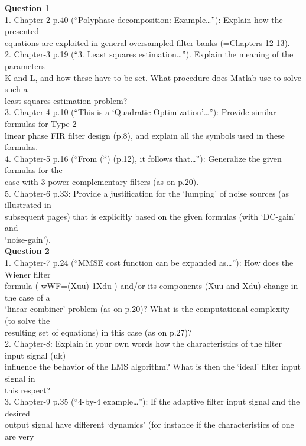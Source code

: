 \documentclass[
  a4paper,
  ,captions=tableheading
]{scrartcl}
\begin{document}
\textbf{Question 1}\\
1. Chapter-2 p.40 (``Polyphase decomposition: Example\ldots''): Explain
how the presented\\
equations are exploited in general oversampled filter banks (=Chapters
12-13).\\
2. Chapter-3 p.19 (``3. Least squares estimation\ldots''). Explain the
meaning of the parameters\\
K and L, and how these have to be set. What procedure does Matlab use to
solve such a\\
least squares estimation problem?\\
3. Chapter-4 p.10 (``This is a `Quadratic Optimization'\ldots{}''):
Provide similar formulas for Type-2\\
linear phase FIR filter design (p.8), and explain all the symbols used
in these formulas.\\
4. Chapter-5 p.16 (``From (*) (p.12), it follows that\ldots''):
Generalize the given formulas for the\\
case with 3 power complementary filters (as on p.20).\\
5. Chapter-6 p.33: Provide a justification for the `lumping' of noise
sources (as illustrated in\\
subsequent pages) that is explicitly based on the given formulas (with
`DC-gain' and\\
`noise-gain').\\
\textbf{Question 2}\\
1. Chapter-7 p.24 (``MMSE cost function can be expanded as\ldots{}''):
How does the Wiener filter\\
formula ( wWF=(Xuu)-1Xdu ) and/or its components (Xuu and Xdu) change in
the case of a\\
`linear combiner' problem (as on p.20)? What is the computational
complexity (to solve the\\
resulting set of equations) in this case (as on p.27)?\\
2. Chapter-8: Explain in your own words how the characteristics of the
filter input signal (uk)\\
influence the behavior of the LMS algorithm? What is then the `ideal'
filter input signal in\\
this respect?\\
3. Chapter-9 p.35 (``4-by-4 example\ldots{}''): If the adaptive filter
input signal and the desired\\
output signal have different `dynamics' (for instance if the
characteristics of one are very\\
\end{document}
